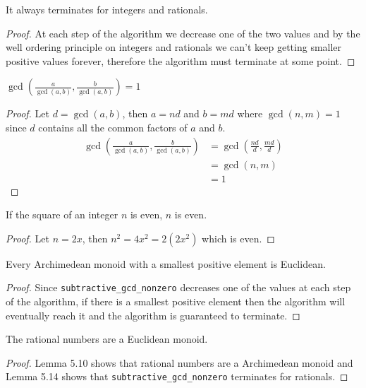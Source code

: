 \begin{lemma}
	It always terminates for integers and rationals.
\end{lemma}

\begin{proof}
	At each step of the algorithm we decrease one of the two values and by the well ordering principle
	on integers and rationals we can't keep getting smaller positive values forever, therefore the
	algorithm must terminate at some point.
\end{proof}

\begin{lemma}
	$\gcd(\frac{a}{\gcd(a, b)}, \frac{b}{\gcd(a, b)}) = 1$
\end{lemma}

\begin{proof}
	Let $d = \gcd(a, b)$, then $a = nd$ and $b = md$ where $\gcd(n, m) = 1$ since $d$ contains
	all the common factors of $a$ and $b$.
	\begin{align*}
		\gcd(\frac{a}{\gcd(a, b)}, \frac{b}{\gcd(a, b)})
		&= \gcd(\frac{nd}{d}, \frac{md}{d})\\
		&= \gcd(n, m)\\
		&= 1
	\end{align*}
\end{proof}

\begin{lemma}
	If the square of an integer $n$ is even, $n$ is even.
\end{lemma}

\begin{proof}
	Let $n = 2x$, then $n^2 = 4x^2 = 2(2x^2)$ which is even.
\end{proof}

\begin{lemma}
	Every Archimedean monoid with a smallest positive element is Euclidean.
\end{lemma}

\begin{proof}
	Since \verb|subtractive_gcd_nonzero| decreases one of the values at each
	step of the algorithm, if there is a smallest positive element then the
	algorithm will eventually reach it and the algorithm is guaranteed to
	terminate.
\end{proof}

\begin{lemma}
	The rational numbers are a Euclidean monoid.
\end{lemma}

\begin{proof}
	Lemma 5.10 shows that rational numbers are a Archimedean monoid and
	Lemma 5.14 shows that \verb|subtractive_gcd_nonzero| terminates for
	rationals.
\end{proof}

